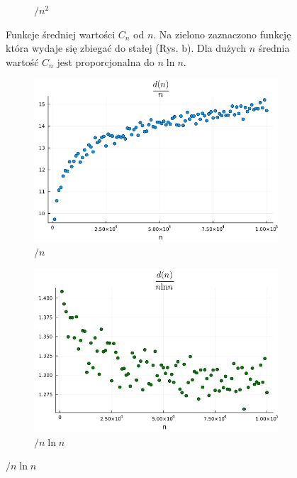 \documentclass{article}
\begin{document}
\begin{figure}[h]
\begin{subfigure}{0.32\textwidth}
        \caption{$/ n^2$}
    \end{subfigure}
    \caption{Funkcje średniej wartości $C_n$ od $n$. Na zielono zaznaczono funkcję która wydaje się zbiegać do stałej (Rys. b). Dla dużych $n$ średnia wartość $C_n$ jest proporcjonalna do $n\ln n$.}
\end{figure}

\begin{figure}[h]
    \centering
    \begin{subfigure}{0.32\textwidth}
        \centering
        \includegraphics[width=1.0\textwidth]{../results/d(n)_1.png}
        \caption{$/ n$}
    \end{subfigure}
    \begin{subfigure}{0.32\textwidth}
        \centering
        \includegraphics[width=1.0\textwidth]{../results/d(n)_2.png}
        \caption{$/ n \ln n$}
    \end{subfigure}

\end{figure}
\end{document}
